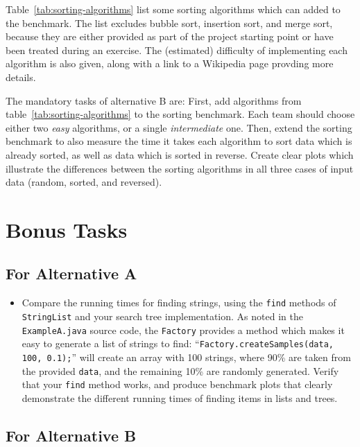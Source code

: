 \documentclass[a4paper,10pt]{article}
\begin{document}
Table~\ref{tab:sorting-algorithms} list some sorting algorithms which can added to the benchmark.
The list excludes bubble sort, insertion sort, and merge sort, because they are either provided as part of the project starting point or have been treated during an exercise.
The (estimated) difficulty of implementing each algorithm is also given, along with a link to a Wikipedia page provding more details.

The mandatory tasks of alternative B are:
First, add algorithms from table~\ref{tab:sorting-algorithms} to the sorting benchmark.
Each team should choose either two \emph{easy} algorithms, or a single \emph{intermediate} one.
Then, extend the sorting benchmark to also measure the time it takes each algorithm to sort data which is already sorted, as well as data which is sorted in reverse.
Create clear plots which illustrate the differences between the sorting algorithms in all three cases of input data (random, sorted, and reversed).



\section{Bonus Tasks}\label{sec:tasks2}

\subsection*{For Alternative A}

\begin{itemize}
\item
  Compare the running times for finding strings, using the \texttt{find} methods of \texttt{StringList} and your search tree implementation.
  As noted in the \texttt{ExampleA.java} source code, the \texttt{Factory} provides a method which makes it easy to generate a list of strings to find:
  ``\texttt{Factory.create\-Samples(data, 100, 0.1);}'' will create an array with 100 strings, where 90\% are taken from the provided \texttt{data}, and the remaining 10\% are randomly generated.
  Verify that your \texttt{find} method works, and produce benchmark plots that clearly demonstrate the different running times of finding items in lists and trees.
\end{itemize}

\subsection*{For Alternative B}
\end{document}
